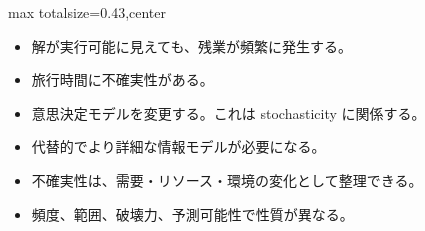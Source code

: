 \clearpage
{}
\begin{minipage}[t]{0.405\textwidth}
\begin{adjustbox}{max totalsize={\textwidth}{0.43\textheight},center}
\begin{minipage}{\textwidth}\scriptsize
{}\begin{itemize}
\item 解が実行可能に見えても、残業が頻繁に発生する。
\item 旅行時間に不確実性がある。
\item 意思決定モデルを変更する。これは stochasticity に関係する。
\item 代替的でより詳細な情報モデルが必要になる。
\end{itemize}\begin{itemize}
\item 不確実性は、需要・リソース・環境の変化として整理できる。
\item 頻度、範囲、破壊力、予測可能性で性質が異なる。
\end{itemize}
\end{minipage}
\end{adjustbox}
\end{minipage}\hfill
